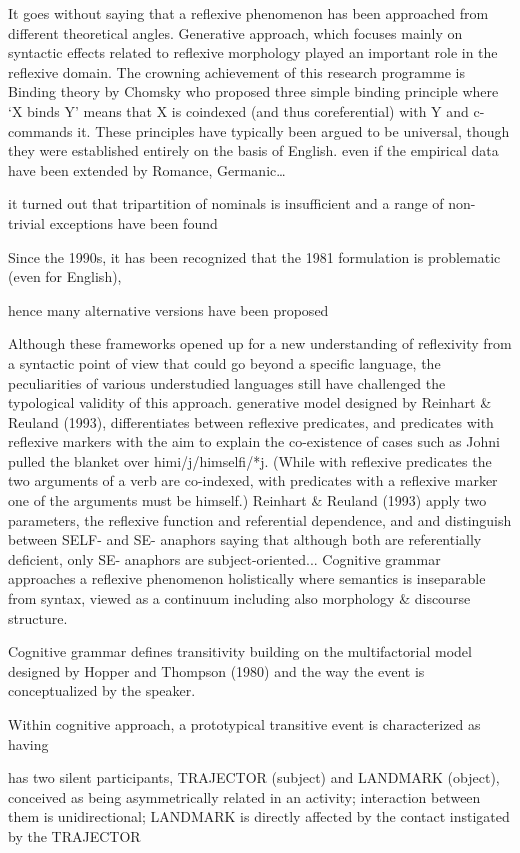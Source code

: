 \documentclass[output=paper]{langscibook}
\begin{document}
It goes without saying that a reflexive phenomenon has been approached from different theoretical angles. 
Generative approach, which focuses mainly on syntactic effects related to reflexive morphology played an important role in the reflexive domain.
The crowning achievement of this research programme is Binding theory by Chomsky 
who proposed three simple binding principle 
where ‘X binds Y’ means that X is coindexed (and thus coreferential) with Y and c-commands it. 
These principles have typically been argued to be universal, though they were established entirely on the basis of English. 
even if the empirical data have been extended by Romance, Germanic…

it turned out that tripartition of nominals is insufficient and a range of non-trivial exceptions have been found

Since the 1990s, it has been recognized that the 1981 formulation is problematic (even for English), 

hence many alternative versions have been proposed 

Although these frameworks opened up for a new understanding of reflexivity from a syntactic point of view that could go beyond a specific language, the peculiarities of various understudied languages still have challenged the typological validity of this approach.
generative model designed by Reinhart \& Reuland (1993), differentiates between reflexive predicates, and predicates with reflexive markers
with the aim to explain the co-existence of cases such as Johni pulled the blanket over himi/j/himselfi/*j. 
(While with reflexive predicates the two arguments of a verb are co-indexed, with predicates with a reflexive marker one of the arguments must be himself.) 
Reinhart \& Reuland (1993) apply two parameters, the reflexive function and referential dependence, and 
and distinguish between SELF- and SE- anaphors saying that
although both are referentially deficient, only SE- anaphors are subject-oriented...
Cognitive grammar approaches a reflexive phenomenon holistically where semantics is inseparable from syntax, viewed as a continuum including also morphology \& discourse structure. 

Cognitive grammar defines transitivity 
building on the multifactorial model designed by Hopper and Thompson (1980) 
and the way the event is conceptualized by the speaker.

Within cognitive approach, a prototypical transitive event is characterized as having

has two silent participants, TRAJECTOR (subject) and LANDMARK (object), conceived as being asymmetrically related in an activity;
interaction between them is unidirectional;
LANDMARK is directly affected by the contact instigated by the TRAJECTOR
\end{document}
